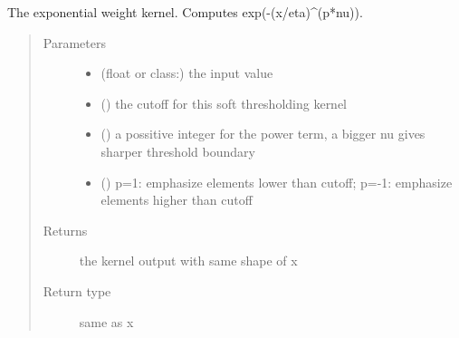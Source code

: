 \documentclass[letterpaper,10pt,english]{sphinxmanual}
\begin{document}
\begin{fulllineitems}
\label{\detokenize{api:spaotsc.SpaOTsc.phi_exp}}
The exponential weight kernel. Computes exp(-(x/eta)\textasciicircum{}(p*nu)).
\begin{quote}\begin{description}
\item[{Parameters}] \leavevmode\begin{itemize}
\item {} 
 (float or class:) \textendash{} the input value

\item {} 
 () \textendash{} the cutoff for this soft thresholding kernel

\item {} 
 () \textendash{} a possitive integer for the power term, a bigger nu gives sharper threshold boundary

\item {} 
 () \textendash{} p=1: emphasize elements lower than cutoff; p=-1: emphasize elements higher than cutoff

\end{itemize}

\item[{Returns}] \leavevmode
the kernel output with same shape of x

\item[{Return type}] \leavevmode
same as x

\end{description}\end{quote}

\end{fulllineitems}

\end{document}
